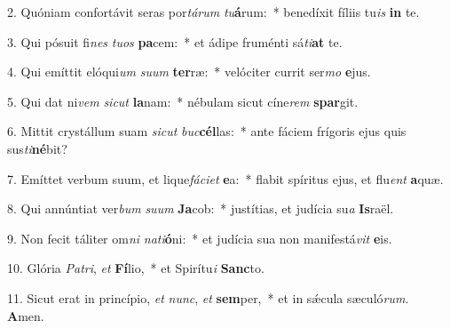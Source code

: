 2. Quóniam confortávit seras por\textit{tá}\textit{rum} \textit{tu}\textbf{á}rum:~*  benedíxit fíliis tu\textit{is} \textbf{in} te.\

3. Qui pósuit fi\textit{nes} \textit{tu}\textit{os} \textbf{pa}cem:~*  et ádipe fruménti sá\textit{ti}\textbf{at} te.\

4. Qui emíttit elóqui\textit{um} \textit{su}\textit{um} \textbf{ter}ræ:~*  velóciter currit ser\textit{mo} \textbf{e}jus.\

5. Qui dat ni\textit{vem} \textit{sic}\textit{ut} \textbf{la}nam:~*  nébulam sicut cíne\textit{rem} \textbf{spar}git.\

6. Mittit crystállum suam \textit{sic}\textit{ut} \textit{buc}\textbf{cél}las:~*  ante fáciem frígoris ejus quis sus\textit{ti}\textbf{né}bit?\

7. Emíttet verbum suum, et lique\textit{fá}\textit{ci}\textit{et} \textbf{e}a:~*  flabit spíritus ejus, et flu\textit{ent} \textbf{a}quæ.\

8. Qui annúntiat ver\textit{bum} \textit{su}\textit{um} \textbf{Ja}cob:~*  justítias, et judícia su\textit{a} \textbf{Is}raël.\

9. Non fecit táliter om\textit{ni} \textit{na}\textit{ti}\textbf{ó}ni:~*  et judícia sua non manifestá\textit{vit} \textbf{e}is.\

10. Glória \textit{Pa}\textit{tri}, \textit{et} \textbf{Fí}lio,~*  et Spirítu\textit{i} \textbf{Sanc}to.\

11. Sicut erat in princípio, \textit{et} \textit{nunc}, \textit{et} \textbf{sem}per,~*  et in sǽcula sæculó\textit{rum}. \textbf{A}men.\

